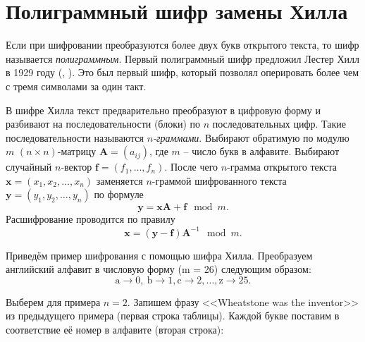 \section{Полиграммный шифр замены Хилла}

Если при шифровании преобразуются более двух букв открытого текста, то шифр называется \emph{полиграммным}. Первый полиграммный шифр предложил Лестер Хилл в 1929 году (, \cite{Hill:1929, Hill:1931}). Это был первый шифр, который позволял оперировать более чем с тремя символами за один такт.

В шифре Хилла текст предварительно преобразуют в цифровую форму и разбивают на последовательности (блоки) по $n$ последовательных цифр. Такие последовательности называются \emph{$n$-граммами}. Выбирают обратимую по модулю $m$  $(n \times n)$-матрицу $\mathbf{A} = (a_{ij})$, где  $m$ -- число букв в алфавите. Выбирают случайный $n$-вектор $\mathbf{f} = (f_1,  \dots, f_n)$. После чего  $n$-грамма открытого текста $\mathbf{x} = (x_1, x_2,  \dots, x_n)$ заменяется $n$-граммой шифрованного текста $\mathbf{y} = (y_1, y_2,  \dots, y_n)$ по формуле
    \[ \mathbf{y} = \mathbf{x} \mathbf{A} + \mathbf{f} \mod m. \]
Расшифрование проводится по правилу
    \[ \mathbf{x} = (\mathbf{y} - \mathbf{f}) \mathbf{A}^{-1} \mod m. \]

\example
Приведём пример шифрования с помощью шифра Хилла. Преобразуем английский алфавит в числовую форму (m = 26) следующим образом:
\[ \text{a} \rightarrow 0, ~ \text{b} \rightarrow 1, \text{c} \rightarrow 2, \dots, \text{z} \rightarrow 25. \]

Выберем для примера $n=2$. Запишем фразу <<Wheatstone was the inventor>> из предыдущего примера (первая строка таблицы). Каждой букве поставим в соответствие её номер в алфавите (вторая строка):
\begin{center}  \end{center}


